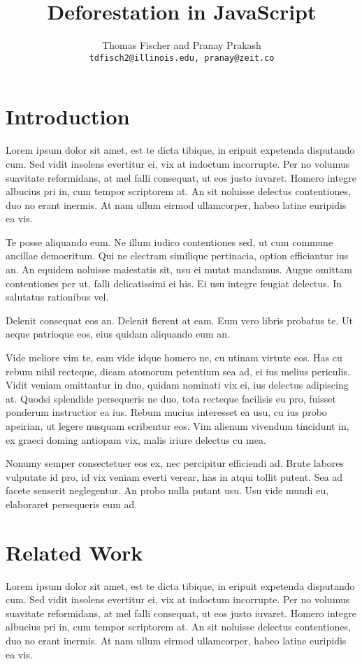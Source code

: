 \documentclass[10pt, letterpapper]{proc}
\author{
    Thomas Fischer and Pranay Prakash\\
    \texttt{tdfisch2@illinois.edu, pranay@zeit.co}
}
\title{Deforestation in JavaScript}
\begin{document}
\maketitle


\section{Introduction}
Lorem ipsum dolor sit amet, est te dicta tibique, in eripuit expetenda disputando cum. Sed vidit insolens evertitur ei, vix at indoctum incorrupte. Per no volumus suavitate reformidans, at mel falli consequat, ut eos justo iuvaret. Homero integre albucius pri in, cum tempor scriptorem at. An sit noluisse delectus contentiones, duo no erant inermis. At nam ullum eirmod ullamcorper, habeo latine euripidis ea vis.

Te posse aliquando eum. Ne illum iudico contentiones sed, ut cum commune ancillae democritum. Qui ne electram similique pertinacia, option efficiantur ius an. An equidem noluisse maiestatis sit, usu ei mutat mandamus. Augue omittam contentiones per ut, falli delicatissimi ei his. Ei usu integre feugiat delectus. In salutatus rationibus vel.

Delenit consequat eos an. Delenit fierent at eam. Eum vero libris probatus te. Ut aeque patrioque eos, eius quidam aliquando eum an.

Vide meliore vim te, eam vide idque homero ne, cu utinam virtute eos. Has cu rebum nihil recteque, dicam atomorum petentium sea ad, ei ius melius periculis. Vidit veniam omittantur in duo, quidam nominati vix ei, ius delectus adipiscing at. Quodsi splendide persequeris ne duo, tota recteque facilisis eu pro, fuisset ponderum instructior ea ius. Rebum mucius interesset ea usu, cu ius probo apeirian, ut legere nusquam scribentur eos. Vim alienum vivendum tincidunt in, ex graeci doming antiopam vix, malis iriure delectus cu mea.

Nonumy semper consectetuer eos ex, nec percipitur efficiendi ad. Brute labores vulputate id pro, id vix veniam everti verear, has in atqui tollit putent. Sea ad facete senserit neglegentur. An probo nulla putant usu. Usu vide mundi eu, elaboraret persequeris eum ad.

\section{Related Work} \label{label:related_work}
Lorem ipsum dolor sit amet, est te dicta tibique, in eripuit expetenda disputando cum. Sed vidit insolens evertitur ei, vix at indoctum incorrupte. Per no volumus suavitate reformidans, at mel falli consequat, ut eos justo iuvaret. Homero integre albucius pri in, cum tempor scriptorem at. An sit noluisse delectus contentiones, duo no erant inermis. At nam ullum eirmod ullamcorper, habeo latine euripidis ea vis.
\end{document}

